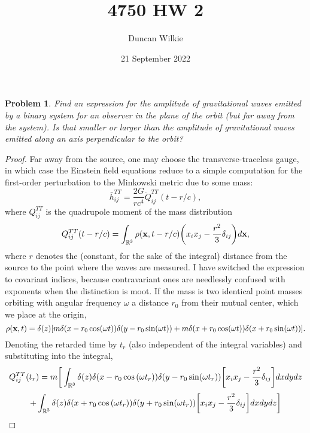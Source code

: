 \documentclass{article}
\title{4750 HW 2}
\author{Duncan Wilkie}
\date{21 September 2022}
\newtheorem{prob}{Problem}
\begin{document}
\maketitle

\begin{prob}
  Find an expression for the amplitude of gravitational waves emitted by a binary system for an observer in the plane of the orbit
  (but far away from the system).
  Is that smaller or larger than the amplitude of gravitational waves emitted along an axis perpendicular to the orbit?
\end{prob}

\begin{proof}
  Far away from the source, one may choose the transverse-traceless gauge,
  in which case the Einstein field equations reduce to a simple computation for the first-order perturbation to the Minkowski metric due to some mass:
  \[
    \bar{h}^{TT}_{ij} = \frac{2G}{rc^{4}}\ddot{Q}_{ij}^{TT}(t - r/c),
  \]
  where $Q_{ij}^{TT}$ is the quadrupole moment of the mass distribution
  \[
    Q_{ij}^{TT}(t - r/c) = \int_{\mathbb{R}^{3}}\rho(\vb{x}, t - r/c)\qty(x_{i}x_{j} -\frac{r^{2}}{3}\delta_{ij})d\vb{x},
  \]
  where $r$ denotes the (constant, for the sake of the integral) distance from the source to the point where the waves are measured.
  I have switched the expression to covariant indices, because contravariant ones are needlessly confused with exponents when the distinction is moot.
  If the mass is two identical point masses orbiting with angular frequency $\omega$ a distance $r_{0}$ from their mutual center,
  which we place at the origin,
  \[
    \rho(\vb{x}, t) = \delta(z)\qty[m\delta(x - r_{0}\cos(\omega t))\delta(y - r_{0}\sin(\omega t)) +
    m\delta(x + r_{0}\cos(\omega t))\delta(x + r_{0}\sin(\omega t))].
  \]
  Denoting the retarded time by $t_{r}$ (also independent of the integral variables) and substituting into the integral,
  \[
    Q_{ij}^{TT}(t_{r}) = m\bigg[\int_{\mathbb{R}^{3}}\delta(z)\delta\qty(x- r_{0}\cos\qty(\omega t_{r}))
    \delta\qty(y - r_{0}\sin(\omega t_{r}))
    \qty[x_{i}x_{j}-\frac{r^{2}}{3}\delta_{ij}]dxdydz
  \]
  \[
     + \int_{\mathbb{R}^{3}}\delta(z)\delta\qty(x + r_{0}\cos\qty(\omega t_{r}))\delta\qty(y + r_{0}\sin(\omega t_{r}))
     \qty[x_{i}x_{j}-\frac{r^{2}}{3}\delta_{ij}]dxdydz\bigg]
   \]


\end{proof}
\end{document}
